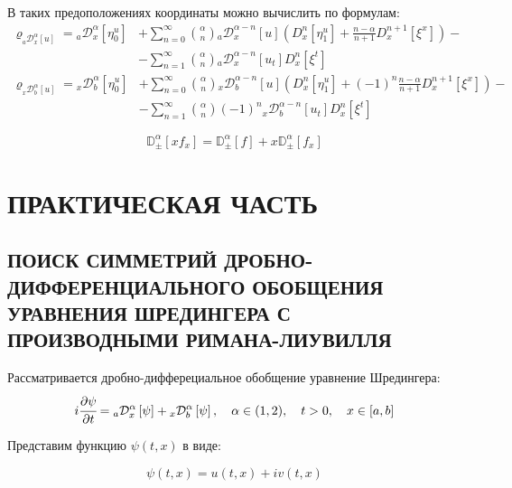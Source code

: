 \documentclass[a4paper, fontsize=14pt]{article}
\newcommand{\MD}[2]{\mathbb{D}_{#1}^{\alpha}[#2]} %
\newcommand{\RLD}[3]{{}_{#1}\mathcal{D}_{#2}^{\alpha} \left[#3\right]} %
\newcommand{\D}[3]{D_{#1}^{#2} \left[ #3 \right]} %
\newcommand{\RLDa}[4]{{}_{#1}\mathcal{D}_{#2}^{#4} \left[#3\right]} %
\begin{document}
В таких предоположениях координаты можно вычислить по формулам:
\begin{equation}
  \label{eq:cont_RL_left_la}
  \begin{split}\varrho_{\RLD{a}{x}{u}} = \RLD{a}{x}{\eta^u_0} &+ \sum_{n=0}^{\infty} \binom{\alpha}{n} \RLDa{a}{x}{u}{\alpha - n}  \left( \D{x}{n}{\eta^u_1} + \frac{n-\alpha}{n+1} \D{x}{n+1}{\xi^x} \right)- \\
    &- \sum_{n=1}^{\infty} \binom{\alpha}{n} \RLDa{a}{x}{u_t}{\alpha-n} \D{x}{n}{\xi^t}
  \end{split}
\end{equation}
\begin{equation}
  \label{eq:cont_RL_right_la}
  \begin{split}\varrho_{\RLD{x}{b}{u}} = \RLD{x}{b}{\eta^u_0} &+ \sum_{n=0}^{\infty} \binom{\alpha}{n} \RLDa{x}{b}{u}{\alpha - n} \left( \D{x}{n}{\eta^u_1} + (-1)^n \frac{n-\alpha}{n+1}  \D{x}{n+1}{\xi^x} \right)- \\
    &- \sum_{n=1}^{\infty} \binom{\alpha}{n} (-1)^n \RLDa{x}{b}{u_t}{\alpha-n} \D{x}{n}{\xi^t}
  \end{split}
\end{equation}

\begin{equation}
  \label{eq:MD_xux}
  \MD{\pm}{x f_x} = \MD{\pm}{f} + x \MD{\pm}{f_x}
\end{equation}

\section[Практическая часть]{ПРАКТИЧЕСКАЯ ЧАСТЬ}
\subsection[Поиск симметрий дробно-дифференциального обобщения уравнения Шредингера с производными Римана-Лиувилля]{ПОИСК СИММЕТРИЙ ДРОБНО-ДИФФЕРЕНЦИАЛЬНОГО ОБОБЩЕНИЯ УРАВНЕНИЯ ШРЕДИНГЕРА С ПРОИЗВОДНЫМИ РИМАНА-ЛИУВИЛЛЯ}

Рассматривается дробно-дифферециальное обобщение уравнение Шредингера:
\begin{equation}
  \label{eq:shredinger_RL_inline}
  i \cfrac{\partial \psi}{\partial t} = \RLD{a}{x}{\psi} + \RLD{x}{b}{\psi}, \quad \alpha \in (1, 2), \quad t > 0, \quad x \in [a, b]
\end{equation}

Представим функцию $\psi(t, x)$ в виде:

\begin{equation*}
  \psi(t, x) = u(t, x) + i v(t, x)
\end{equation*}
\end{document}
